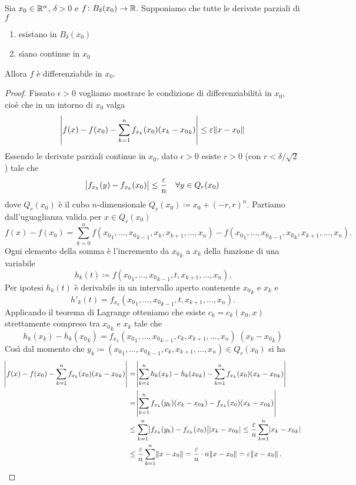 \begin{thm} \label{thm:difftot}
	Sia $ x_0 \in \mathbb{R}^n $, $ \delta > 0 $ e $ f \colon B_{\delta}(x_0) \to \mathbb{R} $. Supponiamo che tutte le derivate parziali di $ f $
	\begin{enumerate}[label = (\roman*)]
		\item esistano in $ B_{\delta}(x_0) $
		\item siano continue in $ x_0 $
	\end{enumerate}
	Allora $ f $ è differenziabile in $ x_0 $. 
\end{thm}
%
\begin{proof}
	Fissato $ \epsilon > 0 $ vogliamo mostrare le condizione di differenziabilità in $ x_0 $, cioè che in un intorno di $ x_0 $ valga
	\[
		\abs{f(x) - f(x_0) - \sum_{k = 1}^{n} f_{x_k}(x_0)(x_k - {x_0}_k)} \leq \varepsilon \norm{x - x_0}
	\]
	Essendo le derivate parziali continue in $ x_0 $, dato $ \epsilon > 0 $ esiste $ r > 0 $ (con $ r < \delta / \sqrt{2} $) tale che 
	\[
		\abs{f_{x_k}(y) - f_{x_k}(x_0)} \leq \frac{\varepsilon}{n} \quad \forall y \in Q_{r}(x_0)
	\]
	dove $ Q_r(x_0) $ è il cubo $ n $-dimensionale $ Q_r(x_0) \coloneqq x_0 + (-r, r)^n $. Partiamo dall'uguaglianza valida per $ x \in Q_{r}(x_0) $
	\[
		f(x) - f(x_0) = \sum_{k = 0}^{n} f({x_0}_1, \ldots, {x_0}_{k - 1}, x_k, x_{k + 1}, \ldots, x_n) - f({x_0}_1, \ldots, {x_0}_{k - 1}, {x_0}_k, x_{k + 1}, \ldots, x_n).
	\]
	Ogni elemento della somma è l'incremento da $ {x_0}_{k} $ a $ x_k $ della funzione di una variabile 
	\[
		h_k(t) \coloneqq f({x_0}_1, \ldots, {x_0}_{k - 1}, t, x_{k + 1}, \ldots, x_n).
	\]
	Per ipotesi $ h_k(t) $ è derivabile in un intervallo aperto contenente $ {x_0}_{k} $ e $ x_k $ e 
	\[
		h'_k(t) = f_{x_k}({x_0}_1, \ldots, {x_0}_{k - 1}, t, x_{k + 1}, \ldots, x_n).
	\]
	Applicando il teorema di Lagrange otteniamo che esiste $ c_k = c_k(x_0, x) $ strettamente compreso tra $ {x_0}_{k} $ e $ x_k $ tale che
	\[
		h_k(x_k) - h_k({x_0}_k) = f_{x_k}({x_0}_1, \ldots, {x_0}_{k - 1}, c_k, x_{k + 1}, \ldots, x_n) \; (x_k - {x_0}_k)
	\]
	Così dal momento che $ y_k \coloneqq ({x_0}_1, \ldots, {x_0}_{k - 1}, c_k, x_{k + 1}, \ldots, x_n) \in Q_r(x_0) $	si ha
	\begin{align*}
		\abs{f(x) - f(x_0) - \sum_{k = 1}^{n} f_{x_k}(x_0)(x_k - {x_0}_k)} & = \abs{\sum_{k = 1}^{n} h_k(x_k) - h_k({x_0}_k) - \sum_{k = 1}^{n} f_{x_k}(x_0)(x_k - {x_0}_k)} \\
		& = \abs{\sum_{k = 1}^{n} f_{x_k}(y_k) (x_k - {x_0}_k) -  f_{x_k}(x_0)(x_k - {x_0}_k)} \\
		& \leq \sum_{k = 1}^{n} \abs{f_{x_k}(y_k) - f_{x_k}(x_0)} \abs{x_k - {x_0}_k} \leq \frac{\varepsilon}{n} \sum_{k = 1}^{n} \abs{x_k - {x_0}_k} \\
		& \leq \frac{\varepsilon}{n} \sum_{k = 1}^{n} \norm{x - x_0} = \frac{\varepsilon}{n} \cdot n \norm{x - x_0} = \varepsilon \norm{x - x_0}. \qedhere
	\end{align*} 
\end{proof}

